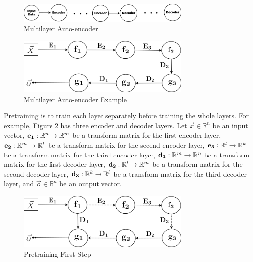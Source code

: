 \documentclass[draft,dvipsnames]{drexel-thesis}
\begin{document}
\begin{thesis}
\begin{figure}[t!]
    \centering
    \includegraphics[width=0.75\textwidth]{pictures/figures/MAE.png}
    \caption{Multilayer Auto-encoder}
    \label{fig:MAE}
\end{figure}

\begin{figure}[t!]
    \centering
    \includegraphics[width=0.75\textwidth]{pictures/figures/example_MAE.png}
    \caption{Multilayer Auto-encoder Example}
    \label{fig:example_MAE}
\end{figure}

	Pretraining is to train each layer separately before training the whole layers. For example, Figure \ref{fig:example_MAE} has three encoder and decoder layers. Let $\vec{x} \in \mathbb{R}^n$ be an input vector, $\bold{e_1}: \mathbb{R}^n \rightarrow \mathbb{R}^m$ be a transform matrix for the first encoder layer, $\bold{e_2}: \mathbb{R}^m \rightarrow \mathbb{R}^l$ be a transform matrix for the second encoder layer, $\bold{e_3}: \mathbb{R}^l \rightarrow \mathbb{R}^k$ be a transform matrix for the third encoder layer, $\bold{d_1}: \mathbb{R}^m \rightarrow \mathbb{R}^n$ be a transform matrix for the first decoder layer, $\bold{d_2}: \mathbb{R}^l \rightarrow \mathbb{R}^m$ be a transform matrix for the second decoder layer, $\bold{d_3}: \mathbb{R}^k \rightarrow \mathbb{R}^l$ be a transform matrix for the third decoder layer, and $\vec{o} \in \mathbb{R}^n$ be an output vector.

\begin{figure}[t!]
    \centering
    \includegraphics[width=0.75\textwidth]{pictures/figures/train_MAE1.png}
    \caption{Pretraining First Step}
    \label{fig:train_MAE1}
\end{figure}


\end{thesis}
\end{document}
